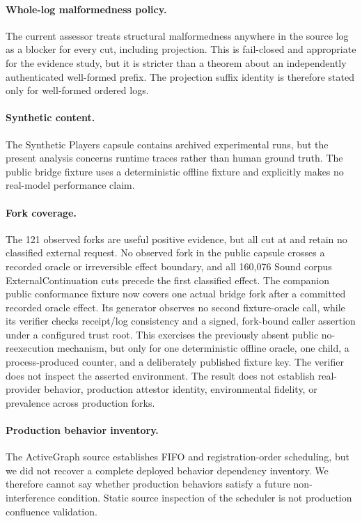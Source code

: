 \paragraph{Whole-log malformedness policy.}
The current assessor treats structural malformedness anywhere in the source log
as a blocker for every cut, including projection.  This is fail-closed and
appropriate for the evidence study, but it is stricter than a theorem about an
independently authenticated well-formed prefix.  The projection suffix identity is
therefore stated only for well-formed ordered logs.

\paragraph{Synthetic content.}
The Synthetic Players capsule contains archived experimental runs, but the
present analysis concerns runtime traces rather than human ground truth.  The
public bridge fixture uses a deterministic offline fixture and explicitly makes
no real-model performance claim.

\paragraph{Fork coverage.}
The 121 observed forks are useful positive evidence, but all cut at
 and retain no classified external request.  No observed
fork in the public capsule crosses a recorded oracle or irreversible effect
boundary, and all 160,076 Sound corpus ExternalContinuation cuts precede the
first classified effect.  The companion public conformance fixture now covers
one actual bridge fork after a committed recorded oracle effect.  Its generator
observes no second fixture-oracle call, while its verifier checks receipt/log
consistency and a signed, fork-bound caller assertion under a configured trust
root.  This exercises the previously absent public no-reexecution mechanism,
but only for one deterministic offline oracle, one child, a process-produced
counter, and a deliberately published fixture key.  The verifier does not
inspect the asserted environment.  The result does not establish real-provider
behavior, production attestor identity, environmental fidelity, or prevalence
across production forks.

\paragraph{Production behavior inventory.}
The ActiveGraph source establishes FIFO and registration-order scheduling, but
we did not recover a complete deployed behavior dependency inventory.  We
therefore cannot say whether production behaviors satisfy a future
non-interference condition.  Static source inspection of the scheduler is not
production confluence validation.

